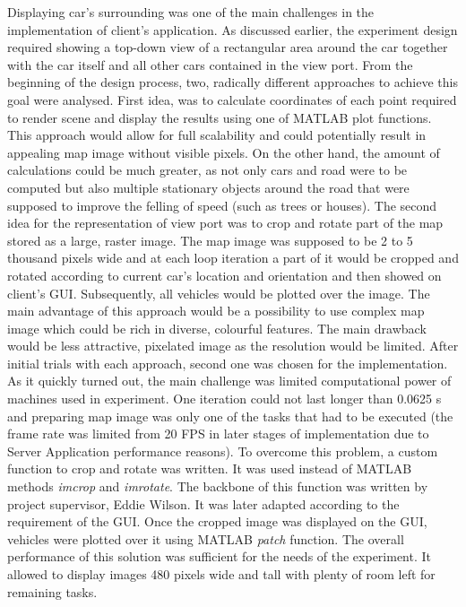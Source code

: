 \documentclass[11pt,english,twoside]{article}
\begin{document}
Displaying car's surrounding was one of the main challenges in the implementation of client's application. As discussed earlier, the experiment design required showing a top-down view of a rectangular area around the car together with the car itself and all other cars contained in the view port. From the beginning of the design process, two, radically different approaches to achieve this goal were analysed. First idea, was to calculate coordinates of each point required to render scene and display the results using one of MATLAB plot functions. This approach would allow for full scalability and could potentially result in appealing map image without visible pixels. On the other hand, the amount of calculations could be much greater, as not only cars and road were to be computed but also multiple stationary objects around the road that were supposed to improve the felling of speed (such as trees or houses). 
The second idea for the representation of view port was to crop and rotate part of the map stored as a large, raster image. The  map image was supposed to be 2 to 5 thousand pixels wide and at each loop iteration a part of it would be cropped and rotated according to current car's location and orientation and then showed on client's GUI. Subsequently, all vehicles would be plotted over the image. The main advantage of this approach would be a possibility to use complex map image which could be rich in diverse, colourful features. The main drawback would be less attractive, pixelated image as the resolution would be limited. 
After initial trials with each approach, second one was chosen for the implementation. As it quickly turned out, the main challenge was limited computational power of machines used in experiment. One iteration could not last longer than 0.0625 s and preparing map image was only one of the tasks that had to be executed (the frame rate was limited from 20 FPS in later stages of implementation due to Server Application performance reasons). To overcome this problem, a custom function to crop and rotate was written. It was used instead of MATLAB methods \textit{imcrop} and \textit{imrotate}. The backbone of this function was written by project supervisor, Eddie Wilson. It was later adapted according to the requirement of the GUI. 
Once the cropped image was displayed on the GUI, vehicles were plotted over it using MATLAB \textit{patch} function. The overall performance of this solution was sufficient for the needs of the experiment. It allowed to display images 480 pixels wide and tall with plenty of room left for remaining tasks.
\end{document}
